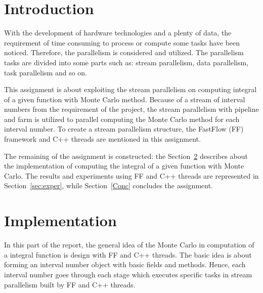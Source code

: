 \documentclass[runningheads,a4paper]{llncs}
\begin{document}
\mainmatter  


\newpage
\tableofcontents
\newpage


\section{Introduction}
\label{sec:intro}


With the development of hardware technologies and a plenty of data, the requirement of time consuming to process or compute some tasks have been noticed.
Therefore, the parallelism is considered and utilized. The parallelism tasks are divided into some parts such as: stream parallelism, data parallelism, task parallelism and so on.

This assignment is about exploiting the stream parallelism on computing integral of a given function with Monte Carlo method.
Because of a stream of interval numbers from the requirement of the project, the stream parallelism with pipeline and farm is utilized to parallel computing the Monte Carlo method for each interval number.
To create a stream parallelism structure, the FastFlow (FF) framework and C++ threads are mentioned in this assignment.


The remaining of the assignment is constructed: the Section~\ref{sec:imple} describes about the implementation of computing the integral of a given function with Monte Carlo. 
The results and experiments using FF and C++ threads are represented in Section~\ref{sec:exper}, while Section~\ref{Conc} concludes the assignment.
	
\section{Implementation}
\label{sec:imple}

In this part of the report, the general idea of the Monte Carlo in computation of a integral function is design with FF and C++ threads.
The basic idea is about forming an interval number object with basic fields and methods. Hence, each interval number goes through each stage which executes specific tasks in stream parallelism built by FF and C++ threads.
\end{document}
